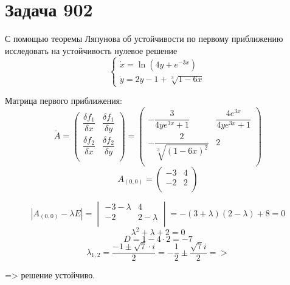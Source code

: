 \section*{Задача 902}
С помощью теоремы Ляпунова об устойчивости по первому приближению исследовать на устойчивость нулевое решение
$$
\begin{cases}
\dot{x} = \ln{(4y + e^{-3x})} \\
\dot{y} = 2y - 1 + \sqrt[3]{1 - 6x}
\end{cases}
$$
\begin{solution}
   Матрица первого приближения: $$ \tilde{A} = \begin{pmatrix}
      \dfrac{\delta f_1}{\delta x} & \dfrac{\delta f_1}{\delta y} \\
      \dfrac{\delta f_2}{\delta x} & \dfrac{\delta f_2}{\delta y} \\
   \end{pmatrix} = \begin{pmatrix}
      -\dfrac{3}{4ye^{3x} + 1} & \dfrac{4e^{3x}}{4ye^{3x} + 1} \\
      -\dfrac{2}{\sqrt[3]{(1 - 6x)^2}} & 2 \\
   \end{pmatrix}$$
   $$ A_{(0, 0)} = \begin{pmatrix} 
      -3 & 4 \\
      -2 & 2 \\
   \end{pmatrix} $$

   $$ |A_{(0, 0)} - \lambda E| = \begin{vmatrix}
      -3 - \lambda & 4 \\
      -2 & 2 - \lambda \\
   \end{vmatrix} = -(3 + \lambda)(2 - \lambda) + 8 = 0 $$
   $$ \lambda^2 + \lambda + 2 = 0 $$
   $$ D = 1 - 4 \cdot 2 = -7 $$
   $$ \lambda_{1, 2} = \dfrac{-1 \pm \sqrt{7} \cdot i}{2} = -\dfrac{1}{2} \pm \dfrac{\sqrt{7} i}{2} => $$

   => решение устойчиво.
   
\end{solution}\pagebreak